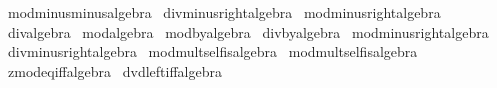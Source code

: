 \begin{isabellebody}
\ mod{\isacharunderscore}{\kern0pt}minus{\isacharunderscore}{\kern0pt}minus{\isacharbrackleft}{\kern0pt}algebra{\isacharbrackright}{\kern0pt}\isanewline
{}\isamarkupfalse%
\ div{\isacharunderscore}{\kern0pt}minus{\isacharunderscore}{\kern0pt}right{\isacharbrackleft}{\kern0pt}algebra{\isacharbrackright}{\kern0pt}\isanewline
{}\isamarkupfalse%
\ mod{\isacharunderscore}{\kern0pt}minus{\isacharunderscore}{\kern0pt}right{\isacharbrackleft}{\kern0pt}algebra{\isacharbrackright}{\kern0pt}\isanewline
{}\isamarkupfalse%
\ div{\isacharunderscore}{\kern0pt}{}{\isacharbrackleft}{\kern0pt}algebra{\isacharbrackright}{\kern0pt}\isanewline
{}\isamarkupfalse%
\ mod{\isacharunderscore}{\kern0pt}{}{\isacharbrackleft}{\kern0pt}algebra{\isacharbrackright}{\kern0pt}\isanewline
{}\isamarkupfalse%
\ mod{\isacharunderscore}{\kern0pt}by{\isacharunderscore}{\kern0pt}{}{\isacharbrackleft}{\kern0pt}algebra{\isacharbrackright}{\kern0pt}\isanewline
{}\isamarkupfalse%
\ div{\isacharunderscore}{\kern0pt}by{\isacharunderscore}{\kern0pt}{}{\isacharbrackleft}{\kern0pt}algebra{\isacharbrackright}{\kern0pt}\isanewline
{}\isamarkupfalse%
\ mod{\isacharunderscore}{\kern0pt}minus{}{\isacharunderscore}{\kern0pt}right{\isacharbrackleft}{\kern0pt}algebra{\isacharbrackright}{\kern0pt}\isanewline
{}\isamarkupfalse%
\ div{\isacharunderscore}{\kern0pt}minus{}{\isacharunderscore}{\kern0pt}right{\isacharbrackleft}{\kern0pt}algebra{\isacharbrackright}{\kern0pt}\isanewline
{}\isamarkupfalse%
\ mod{\isacharunderscore}{\kern0pt}mult{\isacharunderscore}{\kern0pt}self{}{\isacharunderscore}{\kern0pt}is{\isacharunderscore}{\kern0pt}{}{\isacharbrackleft}{\kern0pt}algebra{\isacharbrackright}{\kern0pt}\isanewline
{}\isamarkupfalse%
\ mod{\isacharunderscore}{\kern0pt}mult{\isacharunderscore}{\kern0pt}self{}{\isacharunderscore}{\kern0pt}is{\isacharunderscore}{\kern0pt}{}{\isacharbrackleft}{\kern0pt}algebra{\isacharbrackright}{\kern0pt}\isanewline
{}\isamarkupfalse%
\ zmod{\isacharunderscore}{\kern0pt}eq{\isacharunderscore}{\kern0pt}{}{\isacharunderscore}{\kern0pt}iff{\isacharbrackleft}{\kern0pt}algebra{\isacharbrackright}{\kern0pt}\isanewline
{}\isamarkupfalse%
\ dvd{\isacharunderscore}{\kern0pt}{}{\isacharunderscore}{\kern0pt}left{\isacharunderscore}{\kern0pt}iff{\isacharbrackleft}{\kern0pt}algebra{\isacharbrackright}{\kern0pt}\isanewline

\end{isabellebody}
